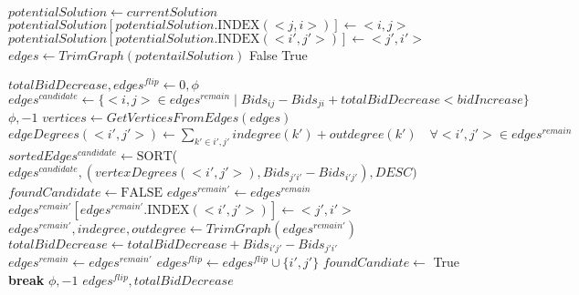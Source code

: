 \documentclass{article}
\begin{document}
\begin{algorithm}[]
\begin{algorithmic}

    \State $potentialSolution \gets currentSolution$
    \State $potentialSolution[potentialSolution.\textrm{INDEX}(<j,i>)] \gets <i,j>$
        \State $potentialSolution[potentialSolution.\textrm{INDEX}(<i',j'>)] \gets <j',i'>$
    \EndFor
    \State $edges \gets TrimGraph(potentailSolution)$
    \State \Return False
    \EndIf
    \State \Return True
\EndFunction

\Statex

\State $totalBidDecrease, edges^{flip} \gets 0, \phi$
\State $edges^{candidate} \gets \{<i,j> \in edges^{remain} \mid Bids_{ij} - Bids_{ji} + totalBidDecrease < bidIncrease\}$
    \State \Return $\phi, -1$
\EndIf
\State $vertices \gets GetVerticesFromEdges(edges)$
\State $edgeDegrees(<i',j'>) \gets \sum_{k' \in {i',j'}} indegree(k') + outdegree(k') \quad \forall <i',j'> \in edges^{remain}$
\State $sortedEdges^{candidate} \gets \textrm{SORT}$(
\State \qquad $edges^{candidate}, (vertexDegrees(<i',j'>), Bids_{j'i'} - Bids_{i'j'}), DESC)$
\State $foundCandidate \gets \textrm{FALSE}$
\State $edges^{remain'} \gets edges^{remain}$
\State $edges^{remain'}[edges^{remain'}.\textrm{INDEX}(<i',j'>)] \gets <j',i'>$
\State $edges^{remain'}, indegree, outdegree \gets TrimGraph(edges^{remain'})$
\State $totalBidDecrease \gets totalBidDecrease + Bids_{i'j'} - Bids_{j'i'}$
\State $edges^{remain} \gets edges^{remain'}$
\State $edges^{flip} \gets edges^{flip} \cup \{{i',j'}\}$
\State $foundCandiate \gets$ True
\State \textbf{break}
\EndIf
\EndFor
{}
\State \Return $\phi, -1$
\EndIf
\EndWhile
\State \Return $edges^{flip}, totalBidDecrease$
\EndFunction

\end{algorithmic}
\end{algorithm}
\end{document}
